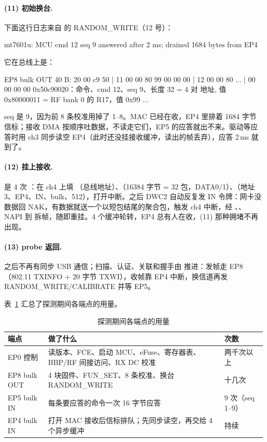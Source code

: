 \paragraph{(11) 初始换台.} 下面这行日志来自  的 RANDOM\_WRITE（12 号）：
\begin{txtcode}
mt7601u: MCU cmd 12 seq 9 answered after 2 ms; drained 1684 bytes from EP4
\end{txtcode}
它在总线上是：
\begin{txtcode}
EP8  bulk OUT 40 B:  20 00 c9 50 | 11 00 00 80 99 00 00 00 | 12 00 00 80 ... | 00 00 00 00
                     0x50c90020：命令、cmd 12、seq 9、长度 32 = 4 对 {地址, 值}
                     0x80000011 = RF bank 0 的 R17，值 0x99 ...
\end{txtcode}
seq 是 9，因为前 8 条校准用掉了 1--8。MAC 已经在收，EP4 里排着 1684 字节信标；接收 DMA 按顺序吐数据，不读走它们，EP5 的应答就出不来。驱动等应答时用 ch3 同步读空 EP4（此时还没挂接收缓冲，读出的帧丢弃），应答 2\,ms 就到了。

\paragraph{(12) 挂上接收.}  是 4 次 ：在 ch4 上填 （总线地址）、（16384 字节 = 32 包，DATA0/1）、（地址 3、EP4、IN、bulk、512），打开中断。之后 DWC2 自动反复发 IN 令牌：网卡没数据回 NAK，有数据就送一个以短包结尾的聚合包，触发 ch4 中断，经 、、NAPI 到  拆帧，随即重挂。4 个缓冲轮转，EP4 总有人在收，(11) 那种拥堵不再出现。

\paragraph{(13) probe 返回.}  之后不再有同步 USB 通信；扫描、认证、关联和握手由  推进：发帧走 EP8（802.11 TXINFO + 20 字节 TXWI），收帧靠 EP4 中断，换信道再发 RANDOM\_WRITE/CALIBRATE 并等 EP5。

表~\ref{tab:mt7601u-epuse} 汇总了探测期间各端点的用量。

\begin{table}[htbp]
  \centering
  \caption{探测期间各端点的用量}
  \label{tab:mt7601u-epuse}
  \small
  \begin{tabularx}{\linewidth}{@{}lXl@{}}
    \toprule
    端点 & 做了什么 & 次数 \\
    \midrule
    EP0 控制 & 读版本、FCE、启动 MCU、eFuse、寄存器表、BBP/RF 间接访问、RX DC 校准 & 两千次以上 \\
    EP8 bulk OUT & 4 块固件、FUN\_SET、8 条校准、换台 RANDOM\_WRITE & 十几次 \\
    EP5 bulk IN & 每条要应答的命令一次 16 字节应答 & 9 次（seq 1--9） \\
    EP4 bulk IN & 打开 MAC 接收后信标排队；先同步读空，再交给 4 个异步缓冲 & 持续 \\
    \bottomrule
  \end{tabularx}
\end{table}

